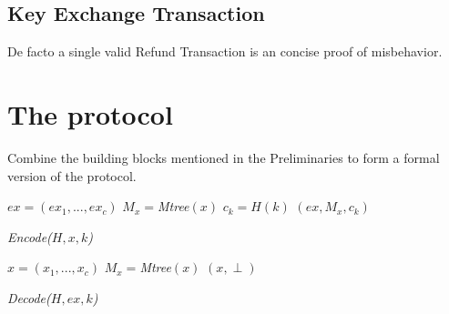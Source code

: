 \documentclass{cacthesis}
\newcounter{protocol}
\begin{document}
        \subsection{Key Exchange Transaction}
        De facto a single valid Refund Transaction is an concise proof of misbehavior.
        
        \section{The protocol}
        Combine the building blocks mentioned in the Preliminaries to form a formal version of the protocol.
                    \begin{algorithm}[H]
            \SetAlgoLined
              $ex = (ex_1,..., ex_c)$\;
              $M_x = $\textit{Mtree}$(x)$\;
              $c_k = H(k)$\;
             \Return $(ex, M_x, c_k)$\;
        
             \caption{\textit{Encode($H, x, k$)}}
            \end{algorithm}
            
            \begin{algorithm}[H]
            \SetAlgoLined
             $x = (x_1,..., x_c)$\;
             $M_x = $\textit{Mtree}$(x)$\;
             \Return $(x, \perp)$\;
             \caption{\textit{Decode($H, ex, k$)}}
            \end{algorithm}
            
\end{document}
